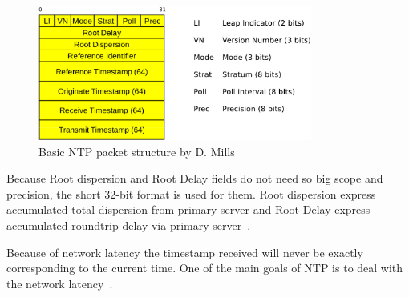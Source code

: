 \begin{figure}
	\centering
	\includegraphics[width=9cm,keepaspectratio]{fig/ntp-packet.pdf}
	\caption{Basic NTP packet structure by D. Mills}
	\label{fig:ntp-packet}
	\bigskip
\end{figure}

Because Root dispersion and Root Delay fields do not need so big scope and precision,
the short 32-bit format is used for them.
Root dispersion express accumulated total dispersion from primary server
and Root Delay express accumulated roundtrip delay via primary server~\cite{ntp-arch}.



Because of network latency the timestamp received will never be exactly corresponding to
the current time.
One of the main goals of NTP is to deal with the network latency~\cite{ntp-overview}.
